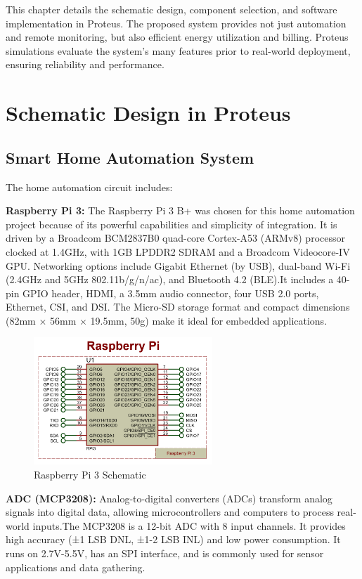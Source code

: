 \documentclass[a4paper,12pt]{report}
\begin{document}
This chapter details the schematic design, component selection, and software implementation in Proteus.  The proposed system provides not just automation and remote monitoring, but also efficient energy utilization and billing.  Proteus simulations evaluate the system's many features prior to real-world deployment, ensuring reliability and performance.

\section{Schematic Design in Proteus}
\subsection{Smart Home Automation System}
The home automation circuit includes:

\textbf{Raspberry Pi 3:} The Raspberry Pi 3 B+ was chosen for this home automation project because of its powerful capabilities and simplicity of integration.  It is driven by a Broadcom BCM2837B0 quad-core Cortex-A53 (ARMv8) processor clocked at 1.4GHz, with 1GB LPDDR2 SDRAM and a Broadcom Videocore-IV GPU. Networking options include Gigabit Ethernet (by USB), dual-band Wi-Fi (2.4GHz and 5GHz 802.11b/g/n/ac), and Bluetooth 4.2 (BLE)\cite{valov2020home}.It includes a 40-pin GPIO header, HDMI, a 3.5mm audio connector, four USB 2.0 ports, Ethernet, CSI, and DSI.  The Micro-SD storage format and compact dimensions (82mm × 56mm × 19.5mm, 50g) make it ideal for embedded applications\cite{valov2020home}.

\begin{figure}[H]  %
    \centering
    \includegraphics[width=0.6\textwidth]{image.png} %
    \caption{Raspberry Pi 3 Schematic}
    \label{fig:Raspberry} %
\end{figure}


\textbf{ADC (MCP3208):} Analog-to-digital converters (ADCs) transform analog signals into digital data, allowing microcontrollers and computers to process real-world inputs.The MCP3208 is a 12-bit ADC with 8 input channels. It provides high accuracy (±1 LSB DNL, ±1-2 LSB INL) and low power consumption.  It runs on 2.7V-5.5V, has an SPI interface, and is commonly used for sensor applications and data gathering\cite{Dout199927V41}.
\end{document}
